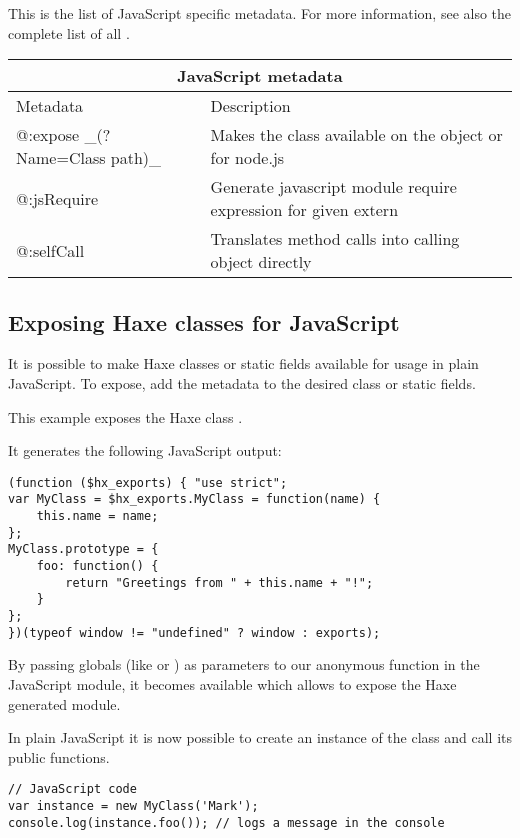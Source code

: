 This is the list of JavaScript specific metadata. For more information, see also the complete list of all .

\begin{center}
\begin{tabular}{| l | l |}
	\hline
	\multicolumn{2}{|c|}{JavaScript metadata} \\ \hline
	Metadata &  Description \\ \hline
	@:expose \_(?Name=Class path)\_  &  Makes the class available on the \expr{window} object or \expr{exports} for node.js  \\
	@:jsRequire  &  Generate javascript module require expression for given extern \\
	@:selfCall  &  Translates method calls into calling object directly \\
\end{tabular}
\end{center}

\subsection{Exposing Haxe classes for JavaScript}
\label{target-javascript-expose}

It is possible to make Haxe classes or static fields available for usage in plain JavaScript.
To expose, add the  metadata to the desired class or static fields.

This example exposes the Haxe class .


It generates the following JavaScript output:

\begin{lstlisting}
(function ($hx_exports) { "use strict";
var MyClass = $hx_exports.MyClass = function(name) {
	this.name = name;
};
MyClass.prototype = {
	foo: function() {
		return "Greetings from " + this.name + "!";
	}
};
})(typeof window != "undefined" ? window : exports);
\end{lstlisting}

By passing globals (like  or ) as parameters to our anonymous function in the JavaScript module, it becomes available which allows to expose the Haxe generated module.

In plain JavaScript it is now possible to create an instance of the class and call its public functions.

\begin{lstlisting}
// JavaScript code
var instance = new MyClass('Mark');
console.log(instance.foo()); // logs a message in the console
\end{lstlisting}

